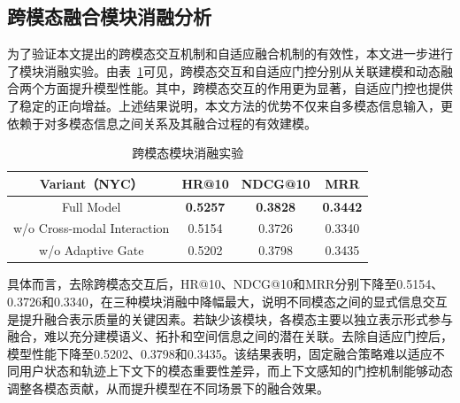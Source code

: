 \documentclass{rjthesis}
\begin{document}


\subsection{跨模态融合模块消融分析}

为了验证本文提出的跨模态交互机制和自适应融合机制的有效性，本文进一步进行了模块消融实验。由表~\ref{tab:cross_modal_ablation}可见，跨模态交互和自适应门控分别从关联建模和动态融合两个方面提升模型性能。其中，跨模态交互的作用更为显著，自适应门控也提供了稳定的正向增益。上述结果说明，本文方法的优势不仅来自多模态信息输入，更依赖于对多模态信息之间关系及其融合过程的有效建模。


\begin{table}[htbp]
\centering
\caption{跨模态模块消融实验}
\label{tab:cross_modal_ablation}
\begin{tabular}{c|ccc}
\hline
Variant（NYC）&HR@10&NDCG@10&MRR\\
\hline
Full Model
&\textbf{0.5257}&\textbf{0.3828}&\textbf{0.3442}\\

w/o Cross-modal Interaction
&0.5154&0.3726&0.3340\\

w/o Adaptive Gate
&0.5202&0.3798&0.3435\\

\hline
\end{tabular}
\end{table}

具体而言，去除跨模态交互后，HR@10、NDCG@10和MRR分别下降至0.5154、0.3726和0.3340，在三种模块消融中降幅最大，说明不同模态之间的显式信息交互是提升融合表示质量的关键因素。若缺少该模块，各模态主要以独立表示形式参与融合，难以充分建模语义、拓扑和空间信息之间的潜在关联。去除自适应门控后，模型性能下降至0.5202、0.3798和0.3435。该结果表明，固定融合策略难以适应不同用户状态和轨迹上下文下的模态重要性差异，而上下文感知的门控机制能够动态调整各模态贡献，从而提升模型在不同场景下的融合效果。
\end{document}
